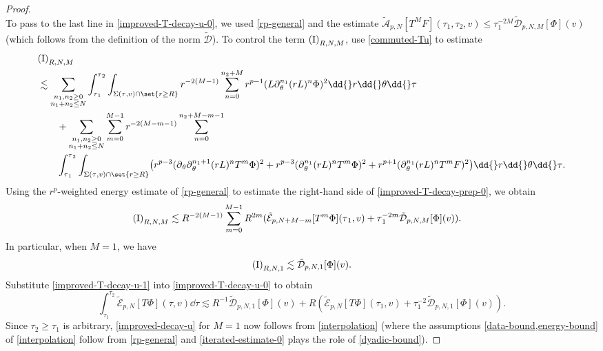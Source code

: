\documentclass[10pt, reqno]{amsart}
\begin{document}
\begin{proof}
\begin{equation}
\end{equation}
To pass to the last line in \cref{improved-T-decay-u-0}, we used \cref{rp-general} and
the estimate \(\tilde{\mathcal{A}}_{p,N}[T^MF](\tau{}_1,\tau{}_2,v)\le
\tau{}_1^{-2M} \tilde{\mathcal{D}}_{p,N,M}[\Phi{}](v)\) (which follows from the
definition of the norm \(\tilde{\mathcal{D}}\)). To control the term
\(\textnormal{(I)}_{R,N,M}\), use \cref{commuted-Tu} to estimate
\begin{equation}\label{improved-T-decay-prep-0}
\begin{split}
&\textnormal{(I)}_{R,N,M}\\
&\lesssim \sum_{\substack{n_1,n_2\ge 0 \\ n_1+n_2\le N}}\int_{\tau{}_1}^{\tau{}_2} \int _{\Sigma{}(\tau{},v)\cap \set{r\ge R}} r^{-2(M-1)}\sum_{n=0}^{n_2+M}r^{p-1}(L\partial{}_\theta^{n_1}(rL)^n\Phi{})^2\dd{}r\dd{}\theta{}\dd{}\tau{} \\
&\qquad + \sum_{\substack{n_1,n_2\ge 0 \\ n_1+n_2\le N}}\sum_{m=0}^{M-1}r^{-2(M-m-1)} \sum_{n=0}^{n_2+M-m-1}\\
&\qquad \int_{\tau{}_1}^{\tau{}_2} \int _{\Sigma{}(\tau{},v)\cap \set{r\ge R}}\bigl(r^{p-3}(\partial{}_\theta\partial{}_\theta^{n_1+1}(rL)^nT^m\Phi{})^2 + r^{p-3}(\partial{}_\theta^{n_1}(rL)^nT^m\Phi{})^2 + r^{p+1}(\partial{}_\theta^{n_1}(rL)^nT^mF)^2\bigr)\dd{}r\dd{}\theta{}\dd{}\tau{}.
\end{split}
\end{equation}
Using the \(r^p\)-weighted energy estimate of \cref{rp-general} to estimate the
right-hand side of \cref{improved-T-decay-prep-0}, we obtain
\begin{equation}\label{improved-decay-iteration-pre}
\begin{split}
\textnormal{(I)}_{R,N,M}&\lesssim R^{-2(M-1)}\sum_{m=0}^{M-1} R^{2m} (\tilde{\mathcal{E}}_{p,N+M-m}[T^m\Phi{}](\tau{}_1,v) +\tau{}_1^{-2m} \tilde{\mathcal{D}}_{p,N,M}[\Phi{}](v)).
\end{split}
\end{equation}
In particular, when \(M = 1\), we have
\begin{equation}\label{improved-T-decay-u-1}
\textnormal{(I)}_{R,N,1}\lesssim \tilde{\mathcal{D}}_{p,N,1}[\Phi{}](v).
\end{equation}
Substitute \cref{improved-T-decay-u-1} into \cref{improved-T-decay-u-0} to obtain
\begin{equation}\label{iterated-estimate-0}
\int_{\tau{}_1}^{\tau{}_2} \tilde{\mathcal{E}}_{p,N}[T\Phi{}](\tau{},v)\dd{}\tau{}\lesssim R^{-1} \tilde{\mathcal{D}}_{p,N,1}[\Phi{}](v) + R(\tilde{\mathcal{E}}_{p,N}[T\Phi{}](\tau{}_1,v) + \tau{}_1^{-2} \tilde{\mathcal{D}}_{p,N,1}[\Phi{}](v)).
\end{equation}
Since \(\tau_2\ge \tau{}_1\) is arbitrary, \cref{improved-decay-u} for \(M=1\) now follows
from \cref{interpolation} (where the assumptions \cref{data-bound,energy-bound} of
\cref{interpolation} follow from \cref{rp-general} and \cref{iterated-estimate-0} plays
the role of \cref{dyadic-bound}).


\end{proof}
\end{document}
